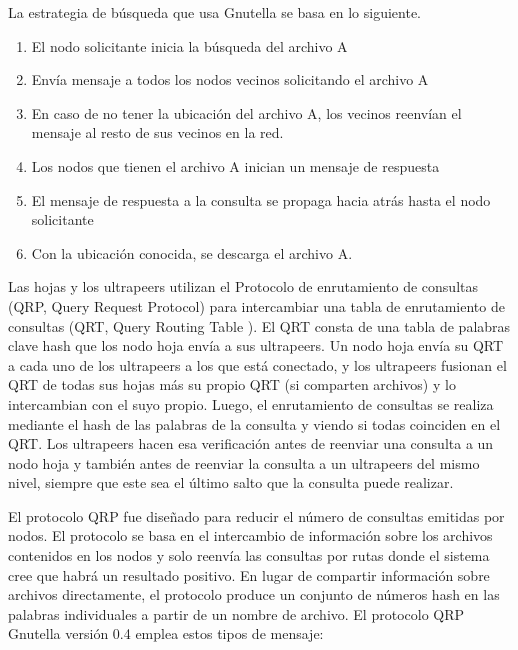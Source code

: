   La estrategia de b\'usqueda que usa Gnutella se basa en lo siguiente. 
 \begin{enumerate}
 	\item El nodo solicitante inicia la búsqueda del archivo A
 	\item  Envía mensaje a todos los nodos vecinos solicitando el archivo A
 	\item  En caso de no tener la ubicaci\'on del archivo A, los vecinos reenvían el mensaje al resto de sus vecinos en la red.
 	\item  Los nodos que tienen el archivo A inician un 	mensaje de respuesta
 	\item El mensaje de respuesta a la consulta se propaga hacia atrás hasta el nodo solicitante
 	\item  Con la ubicaci\'on conocida, se descarga el archivo A.
 \end{enumerate} 
 
  Las hojas y los  ultrapeers utilizan el Protocolo de enrutamiento de consultas (QRP, Query Request Protocol) para intercambiar una tabla de enrutamiento de consultas (QRT, Query Routing Table ). El QRT consta de una tabla de palabras clave hash que los nodo hoja envía a sus ultrapeers.
   Un nodo hoja envía su QRT a cada uno de los ultrapeers a los que está conectado, y los ultrapeers fusionan el QRT de todas sus hojas  más su propio QRT (si comparten archivos) y lo intercambian con el suyo propio.   Luego, el enrutamiento de consultas se realiza mediante el hash de las palabras de la consulta y viendo si todas coinciden en el QRT. Los ultrapeers hacen esa verificación antes de reenviar una consulta a un nodo hoja y también antes de reenviar la consulta a un ultrapeers del mismo nivel, siempre que este sea el último salto que la consulta puede realizar.
 
 
 El protocolo  QRP fue diseñado para reducir el número de consultas emitidas por nodos.  El protocolo  se basa en el intercambio de información sobre los archivos contenidos en los nodos y solo reenvía las consultas por rutas donde el sistema cree que habrá un resultado positivo.
 En lugar de compartir información sobre archivos directamente, el protocolo produce un conjunto de números hash en las palabras individuales a partir de un nombre de archivo.
  El protocolo QRP Gnutella versión 0.4 emplea estos tipos de mensaje:
  
